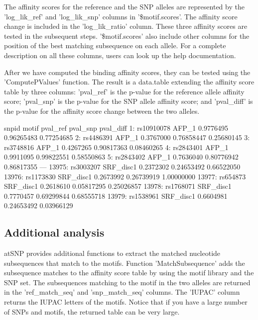 \documentclass[a4paper,10pt]{article}
\begin{document}
The affinity scores for the reference and the SNP alleles are represented by the 'log\_lik\_ref' and 'log\_lik\_snp' columns in '\$motif.scores'. The affinity score change is included in the 'log\_lik\_ratio' column. These three affinity scores are tested in the subsequent steps. '\$motif.scores' also include other columns for the position of the best matching subsequence on each allele. For a complete description on all these columns, users can look up the help documentation.

After we have computed the binding affinity scores, they can be tested using the 'ComputePValues' function. The result is a data.table extending the affinity score table by three columns: 'pval\_ref' is the p-value for the reference allele affinity score; 'pval\_snp' is the p-value for the SNP allele affinity score; and 'pval\_diff' is the p-value for the affinity score change between the two alleles.

\begin{Schunk}
\begin{Soutput}
            snpid     motif  pval_ref   pval_snp  pval_diff
    1: rs10910078     AFP_1 0.9776495 0.96265483 0.77254685
    2:  rs4486391     AFP_1 0.3767000 0.76858447 0.25680145
    3:  rs3748816     AFP_1 0.4267265 0.90817363 0.08460265
    4:  rs2843401     AFP_1 0.9911095 0.99822551 0.58550863
    5:  rs2843402     AFP_1 0.7636040 0.80776942 0.86817355
   ---                                                     
13975:  rs3003207 SRF_disc1 0.2372302 0.24653492 0.66522050
13976:  rs1173830 SRF_disc1 0.2673992 0.26739919 1.00000000
13977:   rs654873 SRF_disc1 0.2618610 0.05817295 0.25026857
13978:  rs1768071 SRF_disc1 0.7770457 0.69299844 0.68555718
13979:  rs1538961 SRF_disc1 0.6604981 0.24653492 0.03966129
\end{Soutput}
\end{Schunk}

\subsection{Additional analysis}

atSNP provides additional functions to extract the matched nucleotide subsequences that match to the motifs. Function 'MatchSubsequence' adds the subsequence matches to the affinity score table by using the motif library and the SNP set. The subsequences matching to the motif in the two alleles are returned in the 'ref\_match\_seq' and 'snp\_match\_seq' columns. The 'IUPAC' column returns the IUPAC letters of the motifs. Notice that if you have a large number of SNPs and motifs, the returned table can be very large.
\end{document}
